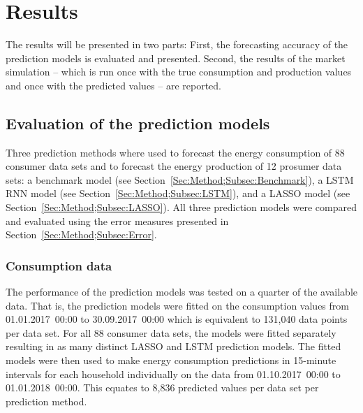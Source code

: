 
\section{Results}\label{Sec:Results}

The results will be presented in two parts: First, the forecasting accuracy of the prediction models is evaluated and presented. Second, the results of the market simulation -- which is run once with the true consumption and production values and once with the predicted values -- are reported.



\subsection{Evaluation of the prediction models}\label{Sec:Results;Subsec:Forecast}

Three prediction methods where used to forecast the energy consumption of 88 consumer data sets and to forecast the energy production of 12 prosumer data sets: a benchmark model (see Section~\ref{Sec:Method;Subsec:Benchmark}), a LSTM RNN model (see Section~\ref{Sec:Method;Subsec:LSTM}), and a LASSO model (see Section~\ref{Sec:Method;Subsec:LASSO}). All three prediction models were compared and evaluated using the error measures presented in Section~\ref{Sec:Method;Subsec:Error}.


\subsubsection{Consumption data}

The performance of the prediction models was tested on a quarter of the available data. That is, the prediction models were fitted on the consumption values from 01.01.2017~00:00 to 30.09.2017~00:00 which is equivalent to 131,040 data points per data set. For all 88 consumer data sets, the models were fitted separately resulting in as many distinct LASSO and LSTM prediction models. The fitted models were then used to make energy consumption predictions in 15-minute intervals for each household individually on the data from 01.10.2017~00:00 to 01.01.2018~00:00. This equates to 8,836 predicted values per data set per prediction method.

